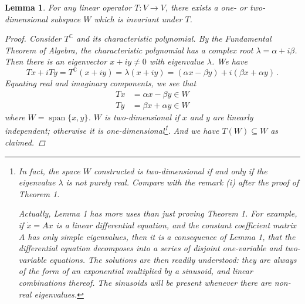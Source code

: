 \documentclass[12pt]{article}
\newcommand{\Tc}{T^\mathbb{C}}
\DeclareMathOperator{\linspan}{span}
\newtheorem{lem}{Lemma}
\begin{document}
\begin{lem}
For any linear operator $T\colon V \to V$, there exists a one- or two-dimensional subspace $W$ which is invariant under $T$.
\begin{proof}
Consider $\Tc$ and its characteristic polynomial.
By the Fundamental Theorem of Algebra, the characteristic polynomial has a complex root $\lambda = \alpha + i \beta$. Then there is an eigenvector $x+iy \neq 0$ with eigenvalue $\lambda$.  We have
\[
Tx + iTy = \Tc(x+iy) = \lambda(x + iy) = (\alpha x - \beta y) + i(\beta x + \alpha y)\,.
\]
Equating real and imaginary components,
we see that
\begin{align*}
Tx &= \alpha x - \beta y \in W \\
Ty &= \beta x + \alpha y \in W
\end{align*}
where $W = \linspan \{ x, y\}$. $W$ is two-dimensional if $x$ and $y$ are linearly independent; otherwise it is one-dimensional\footnote{
In fact, the space $W$ constructed is two-dimensional if and only if the eigenvalue $\lambda$ is not purely real.  Compare with the remark (i) after
the proof of Theorem 1.

Actually, Lemma 1 has more uses than just proving Theorem 1.
For example, if $\dot{x} = Ax$ is a linear differential equation,
and the constant coefficient matrix $A$ has only simple eigenvalues,
then it is a consequence of Lemma 1, that the differential equation decomposes into a series of disjoint one-variable and two-variable equations.
The solutions are then readily understood: they are always of the form of an
exponential multiplied by a sinusoid, and linear combinations thereof.
The sinusoids will be present whenever there are non-real eigenvalues.
}. And we have $T(W) \subseteq W$ as claimed.
\end{proof}
\end{lem}

\bigskip
\end{document}
